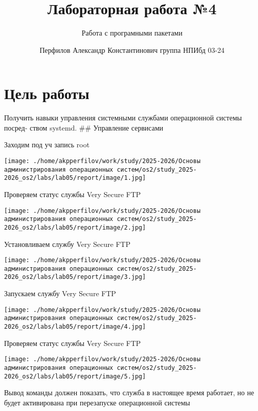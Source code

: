 \documentclass[
  english,
  russian,
  12pt,
  a4paper,
  DIV=11,
  numbers=noendperiod]{scrreprt}
\title{Лабораторная работа №4}
\subtitle{Работа с програмными пакетами}
\author{Перфилов Александр Константинович \textbar{} группа НПИбд 03-24}
\date{}
\renewcommand*\contentsname{Содержание}
\newcommand\contentsname{Содержание}
\begin{document}
\maketitle

\renewcommand*\contentsname{Содержание}
{
\setcounter{tocdepth}{1}
\tableofcontents
}
\listoffigures
\listoftables

\chapter{Цель
работы}\label{ux446ux435ux43bux44c-ux440ux430ux431ux43eux442ux44b}

Получить навыки управления системными службами операционной системы
посред- ством systemd. \#\# Управление сервисами

Заходим под уч запись root

\texttt{[image: ./home/akpperfilov/work/study/2025-2026/Основы администрирования операционных систем/os2/study\_2025-2026\_os2/labs/lab05/report/image/1.jpg]}

Проверяем статус службы Very Secure FTP

\texttt{[image: ./home/akpperfilov/work/study/2025-2026/Основы администрирования операционных систем/os2/study\_2025-2026\_os2/labs/lab05/report/image/2.jpg]}

Установливаем службу Very Secure FTP

\texttt{[image: ./home/akpperfilov/work/study/2025-2026/Основы администрирования операционных систем/os2/study\_2025-2026\_os2/labs/lab05/report/image/3.jpg]}

Запускаем службу Very Secure FTP

\texttt{[image: ./home/akpperfilov/work/study/2025-2026/Основы администрирования операционных систем/os2/study\_2025-2026\_os2/labs/lab05/report/image/4.jpg]}

Проверяем статус службы Very Secure FTP

\texttt{[image: ./home/akpperfilov/work/study/2025-2026/Основы администрирования операционных систем/os2/study\_2025-2026\_os2/labs/lab05/report/image/5.jpg]}

Вывод команды должен показать, что служба в настоящее время работает, но
не будет активирована при перезапуске операционной системы
\end{document}
